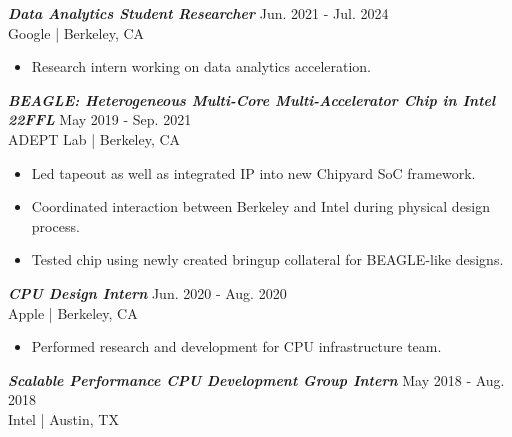 \documentclass[letter]{res}
\begin{document}
\begin{resume}
{\sl \textbf{Data Analytics Student Researcher}} \hfill Jun. 2021 - Jul. 2024\\
Google | Berkeley, CA \newline

 \vspace{-4mm}

 \begin{itemize}
 \item Research intern working on data analytics acceleration.
 \end{itemize}

\vspace{-2mm}

{\sl \textbf{BEAGLE: Heterogeneous Multi-Core Multi-Accelerator Chip in Intel 22FFL}} \hfill May 2019 - Sep. 2021\\
ADEPT Lab | Berkeley, CA \newline

 \vspace{-4mm}

 \begin{itemize}
 \item Led tapeout as well as integrated IP into new Chipyard SoC framework.
 \item Coordinated interaction between Berkeley and Intel during physical design process.
 \item Tested chip using newly created bringup collateral for BEAGLE-like designs.
 \end{itemize}

\vspace{-2mm}

{\sl \textbf{CPU Design Intern}} \hfill Jun. 2020 - Aug. 2020\\
Apple | Berkeley, CA \newline

 \vspace{-4mm}

 \begin{itemize}
 \item Performed research and development for CPU infrastructure team.
 \end{itemize}

\vspace{-2mm}

{\sl \textbf{Scalable Performance CPU Development Group Intern}} \hfill May 2018 - Aug. 2018\\
Intel | Austin, TX \newline

 \vspace{-4mm}


\end{resume}
\end{document}
